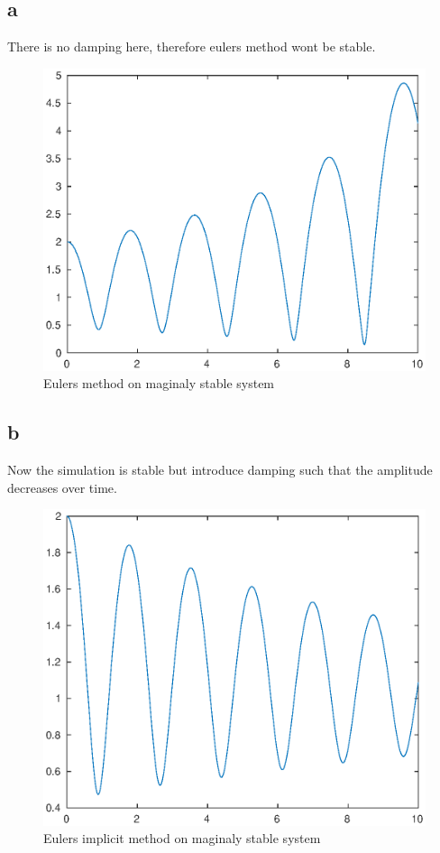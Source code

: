 \documentclass[11pt]{article}
\begin{document}
\subsection*{a}
There is no damping here, therefore eulers method wont be stable.
\begin{figure}[H]
\centering
\includegraphics[width=.8\textwidth]{2a.eps}
\caption{Eulers method on maginaly stable system}
\end{figure}

\subsection*{b}
Now the simulation is stable but introduce damping such that the amplitude decreases over time.
\begin{figure}[H]
\centering
\includegraphics[width=.8\textwidth]{2b.eps}
\caption{Eulers implicit method on maginaly stable system}
\end{figure}
\end{document}
